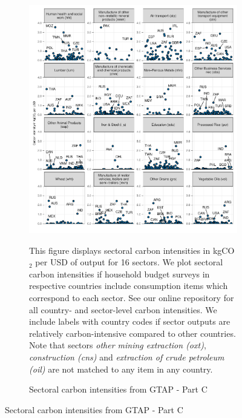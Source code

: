 \begin{figure}[ht!]\ContinuedFloat
\begin{subfigure}[b]{\textwidth}
  \centering
  \includegraphics{Analysis_Carbon_Intensities_GTAP/Figure_2.1.1_C_2017B.pdf}
  \caption{Sectoral carbon intensities from GTAP - Part C} \label{fig:B3}  
  \begin{subcaption2}
    This figure displays sectoral carbon intensities in kgCO$_{2}$ per USD of output for 16 sectors. We plot sectoral carbon intensities if household budget surveys in respective countries include consumption items which correspond to each sector. See our online repository for all country- and sector-level carbon intensities. We include labels with country codes if sector outputs are relatively carbon-intensive compared to other countries. Note that sectors \textit{other mining extraction (oxt)}, \textit{construction (cns)} and \textit{extraction of crude petroleum (oil)} are not matched to any item in any country.
  \end{subcaption2}
\end{subfigure}
\end{figure}

\clearpage

